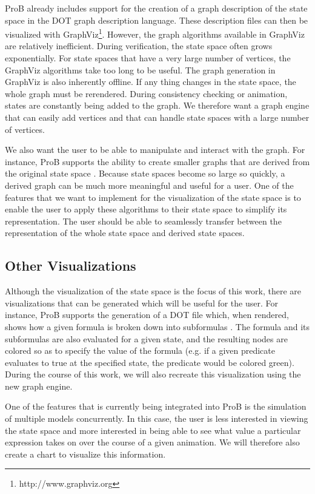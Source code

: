 ProB already includes support for the creation of a graph description of the state space in the DOT graph description language. These description files can then be visualized with GraphViz\footnote{http://www.graphviz.org}. However, the graph algorithms available in GraphViz are relatively inefficient. During verification, the state space often grows exponentially. For state spaces that have a very large number of vertices, the GraphViz algorithms take too long to be useful. The graph generation in GraphViz is also inherently offline. If any thing changes in the state space, the whole graph must be rerendered. During consistency checking or animation, states are constantly being added to the graph. We therefore want a graph engine that can easily add vertices and that can handle state spaces with a large number of vertices.

We also want the user to be able to manipulate and interact with the graph. For instance, ProB supports the ability to create smaller graphs that are derived from the original state space \cite{LeTu05_8}. Because state spaces become so large so quickly, a derived graph can be much more meaningful and useful for a user. One of the features that we want to implement for the visualization of the state space is to enable the user to apply these algorithms to their state space to simplify its representation. The user should be able to seamlessly transfer between the representation of the whole state space and derived state spaces.

\subsection{Other Visualizations}

Although the visualization of the state space is the focus of this work, there are visualizations that can be generated which will be useful for the user. For instance, ProB supports the generation of a DOT file which, when rendered, shows how a given formula is broken down into subformulas \cite{LeSaBeLu08_228}. The formula and its subformulas are also evaluated for a given state, and the resulting nodes are colored so as to specify the value of the formula (e.g. if a given predicate evaluates to true at the specified state, the predicate would be colored green). During the course of this work, we will also recreate this visualization using the new graph engine.

One of the features that is currently being integrated into ProB is the simulation of multiple models concurrently. In this case, the user is less interested in viewing the state space and more interested in being able to see what value a particular expression takes on over the course of a given animation. We will therefore also create a chart to visualize this information.


